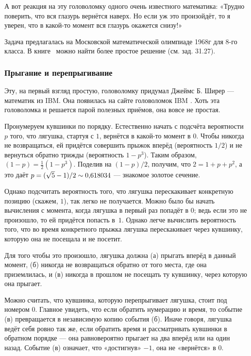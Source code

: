 А вот реакция на эту головоломку одного очень известного математика: «Трудно поверить, что вся глазурь вернётся наверх.
Но если уж это произойдёт, то я уверен, что в какой-то момент вся глазурь окажется снизу!»

\begin{addedbytheeditors}
Задача предлагалась на Московской математической олимпиаде 1968г для 8-го класса. В книге~\cite{23} 
можно найти более простое решение (см. зад. 31.27).\pr
\end{addedbytheeditors}

\subsubsection*{Прыгание и перепрыгивание}

Эту, на первый взгляд простую, головоломку придумал Джеймс Б. Ширер --- математик из IBM.
Она появилась на сайте головоломок IBM \cite[апрель 2007]{ponder-this}.
Хоть эта головоломка и решается парой полезных приёмов, она вовсе не простая.

Пронумеруем кувшинки по порядку.
Естественно начать с подсчёта вероятности $p$ того, что лягушка, стартуя с $1$, вернётся в какой-то момент в $0$.
Чтобы никогда не возвращаться, ей придётся совершить прыжок вперёд (вероятность $1/2$) и не вернуться обратно трижды (вероятность $1 - p^3$).
Таким образом, $(1 - p) = \tfrac12(1 - p^3)$.
Поделив на $(1 - p)/2$, получим, что $2 = 1 + p + p^2$, а это даёт $p = (\sqrt5 - 1)/2 \z\sim 0{,}618034$ --- знакомое золотое сечение.

Однако подсчитать вероятность того, что лягушка перескакивает конкретную позицию (скажем, $1$), так легко не получается.
Можно было бы начать вычисления с момента, когда лягушка в первый раз попадёт в $0$; ведь если это не произошло, то ей придётся попасть в~$1$.
Однако легче вычислить вероятность того, что во время конкретного прыжка лягушка перескакивает через кувшинку, которую она  не посещала и не посетит.

Для того чтобы это произошло, лягушка должна
(а) прыгать вперёд в данный момент,
(б) никогда не возвращаться обратно от того места, где она приземлилась,
и (в) никогда в прошлом не посещать ту кувшинку, через которую она прыгает.

Можно считать, что кувшинка, которую перепрыгивает лягушка, стоит под номером 0.
Главное увидеть, что если обратить нумерацию и время, то событие (в) превращается в независимую копию события (б).
Иначе говоря, лягушка ведёт себя ровно так же, если обратить время и рассматривать кувшинки в обратном порядке ---
она равновероятно прыгает на два вперёд или на один назад.
Событие (в) означает, что «достигнув» $-1$, она не «вернётся» в $0$.

